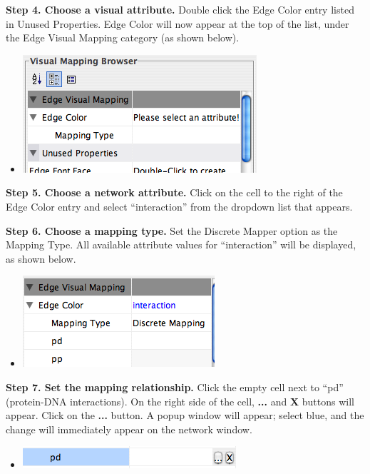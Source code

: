  \textbf{Step 4. Choose a visual attribute.}
 Double click the Edge Color entry listed in Unused Properties. Edge Color will now appear at the top of the list, under the Edge Visual Mapping category (as shown below). 
\begin{itemize}
\item 

 \includegraphics[width=.6\textwidth]{images/EdgeMapping1.png} 


\end{itemize}


 \textbf{Step 5. Choose a network attribute.}
 Click on the cell to the right of the Edge Color entry and select ``interaction'' from the dropdown list that appears. 


 \textbf{Step 6. Choose a mapping type.}
 Set the Discrete Mapper option as the Mapping Type. All available attribute values for ``interaction'' will be displayed, as shown below. 
\begin{itemize}
\item 

 \includegraphics[width=.6\textwidth]{images/EdgeMapping2.png} 


\end{itemize}


 \textbf{Step 7. Set the mapping relationship.}
 Click the empty cell next to ``pd'' (protein-DNA interactions). On the right side of the cell, \textbf{...}
 and \textbf{X}
 buttons will appear. Click on the \textbf{...}
 button. A popup window will appear; select blue, and the change will immediately appear on the network window. 
\begin{itemize}
\item 

 \includegraphics[width=.6\textwidth]{images/CellEditor1.png} 


\end{itemize}



